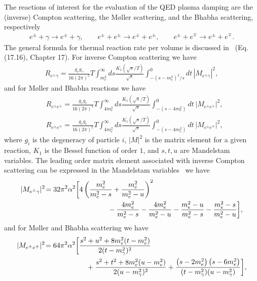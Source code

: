 The reactions of interest for the evaluation of the QED plasma damping are the (inverse) Compton scattering, the M{\o}ller scattering, and the Bhabha scattering, respectively
\begin{align}
e^\pm+\gamma\longrightarrow e^\pm+\gamma,\qquad e^\pm+e^\pm\longrightarrow e^\pm+e^\pm,\qquad e^\pm+e^\mp\longrightarrow e^\pm+e^\mp.
\end{align}
The general formula for thermal reaction rate per volume is discussed in~\cite{Letessier:2002ony} (Eq.(17.16), Chapter 17). For inverse Compton scattering we have
\begin{align}
R_{e^{\pm}\gamma}=\frac{g_eg_\gamma}{16\left(2\pi\right)^5}T\int_{m_e^2}^\infty\!\!\!\!ds\frac{K_1(\sqrt{s}/T)}{\sqrt{s}}\int^0_{-(s-m_e^2)^2/s}\!\!\!\!\!\!dt\, |M_{e^{\pm}\gamma}|^2,
\end{align} 
and for M{\o}ller and Bhabha reactions we have
\begin{align}
&R_{e^\pm e^\pm}=\frac{g_eg_e}{16\left(2\pi\right)^5}T\!\!\int_{4m_e^2}^\infty\!\!\!\!ds\frac{K_1(\sqrt{s}/T)}{\sqrt{s}}\int^0_{-(s-4m_e^2)}\!\!\!\!\!\!dt\,|M_{e^\pm e^\pm}|^2,\\[0.3cm]
&R_{e^\pm e^\mp}=\frac{g_eg_e}{16\left(2\pi\right)^5}T\!\!\int_{4m_e^2}^\infty\!\!\!\!ds\frac{K_1(\sqrt{s}/T)}{\sqrt{s}}\int^0_{-(s-4m_e^2)}\!\!\!\!\!\!dt\,|M_{e^\pm e^\mp}|^2,
\end{align}
where $g_i$ is the degeneracy of particle $i$, $|M|^2$ is the matrix element for a given reaction, $K_1$ is the Bessel function of order $1$, and $s,t,u$ are Mandelstam variables. The leading order matrix element associated with inverse Compton scattering can be expressed in the Mandelstam variables~\cite{Kuznetsova:2011wt,Kuznetsova:2009bq} we have
\begin{align}
|M_{e^\pm\gamma}|^2\!=32 \pi^2\alpha^2\bigg[&4\left(\frac{m_e^2}{m_e^2-s}+\frac{m_e^2}{m_e^2-u}\right)^2\notag\\
&\qquad\qquad-\frac{4m_e^2}{m_e^2-s}-\frac{4m_e^2}{m_e^2-u} -
 \frac{m_e^2-u}{m_e^2-s} -\frac{m_e^2-s}{m_e^2-u}\bigg],
\end{align}
and for M{\o}ller and Bhabha scattering we have 
\begin{align}
|M_{e^{\pm}e^{\pm}}|^{2}\!=64\pi^{2}\alpha^{2}\bigg[&
\frac{s^{2}+u^{2}+8m_e^{2}(t-m_e^{2})}{2(t-m^2_{\gamma})^{2}}\notag\\
&\quad+\frac{{s^{2}+t^{2}}+8m_e^{2}
(u-m_e^{2})}{2(u-m_{\gamma}^2)^{2}} + \frac{\left( {s}-2m_e^{2}\right)\left({s}-6m_e^{2}\right)}
{(t-m_{\gamma}^2)(u-m_{\gamma}^2)} \bigg],
\end{align}
